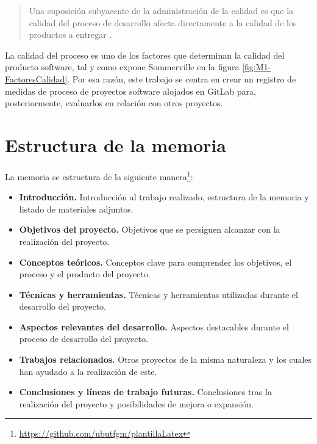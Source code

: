 

\begin{quotation}
	\label{q:Sommerville}
	Una suposición subyacente de la administración de la calidad es que la calidad del proceso de desarrollo afecta directamente a la calidad de los productos a entregar \citep[pág 543]{sommerville_ingenierisoftware_2002}.
\end{quotation}
  
La calidad del proceso es uno de los factores que determinan la calidad del producto software, tal y como expone Sommerville en la figura \ref{fig:M1-FactoresCalidad}.
Por esa razón, este trabajo se centra en crear un registro de medidas de proceso de proyectos software alojados en GitLab para, posteriormente, evaluarlos en relación con otros proyectos.

\section{Estructura de la memoria}

La memoria se estructura de la siguiente manera\footnote{\url{https://github.com/ubutfgm/plantillaLatex}}\cite{ubu_plantilla_2019}:

\begin{itemize}
	\tightlist
	\item
	\textbf{Introducción.} Introducción al trabajo realizado, estructura de la memoria y listado de materiales adjuntos.
	\item
	\textbf{Objetivos del proyecto.} Objetivos que se persiguen alcanzar con la realización del proyecto.
	\item
	\textbf{Conceptos teóricos.} Conceptos clave para comprender los objetivos, el proceso y el producto del proyecto.
	\item
	\textbf{Técnicas y herramientas.} Técnicas y herramientas utilizadas durante el desarrollo del proyecto.
	\item
	\textbf{Aspectos relevantes del desarrollo.} Aspectos destacables durante el proceso de desarrollo del proyecto.
	\item
	\textbf{Trabajos relacionados.} Otros proyectos de la misma naturaleza y los cuales han ayudado a la realización de este.
	\item
	\textbf{Conclusiones y líneas de trabajo futuras.} Conclusiones tras la realización del proyecto y posibilidades de mejora o expansión.
\end{itemize}

